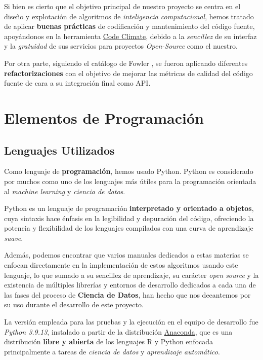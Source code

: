 Si bien es cierto que el objetivo principal de nuestro proyecto se centra en el diseño y explotación de algoritmos de \textit{inteligencia computacional}, hemos tratado de aplicar \textbf{buenas prácticas} de codificación y mantenimiento del código fuente, apoyándonos en la herramienta \href{https://codeclimate.com/github/jesgararm/GestorQuirofanos}{Code Climate}, debido a la \textit{sencillez} de su interfaz y la \textit{gratuidad} de sus servicios para proyectos \textit{Open-Source} como el nuestro.

Por otra parte, siguiendo el catálogo de Fowler \cite{Fowler1999Refactoring:Code}, se fueron aplicando diferentes \textbf{refactorizaciones} con el objetivo de mejorar las métricas de calidad del código fuente de cara a su integración final como API.


\section{Elementos de Programación}

\subsection{Lenguajes Utilizados}

Como lenguaje de \textbf{programación}, hemos usado Python\cite{VanRossum2009PythonManual}. Python es considerado por muchos como uno de los lenguajes más útiles para la programación orientada al \textit{machine learning} y \textit{ciencia de datos}. 

Python es un lenguaje de programación \textbf{interpretado y orientado a objetos}, cuya sintaxis hace énfasis en la legibilidad y depuración del código, ofreciendo la potencia y flexibilidad de los lenguajes compilados con una curva de aprendizaje \textit{suave}. \cite{2021Scikit-LearnPython} 

Además, podemos encontrar que varios manuales dedicados a estas materias \cite{VanderPlas2016PythonData} se enfocan directamente en la implementación de estos algoritmos usando este lenguaje, lo que sumado a su sencillez de aprendizaje, su carácter \textit{open source} y la existencia de múltiples librerías y entornos de desarrollo dedicados a cada una de las fases del proceso de \textbf{Ciencia de Datos}, han hecho que nos decantemos por su uso durante el desarrollo de este proyecto.

La versión empleada para las pruebas y la ejecución en el equipo de desarrollo fue \textit{Python 3.9.13}, instalado a partir de la distribución \href{https://www.anaconda.com/}{Anaconda}, que es una distribución \textbf{libre y abierta} de los lenguajes R y Python enfocada principalmente a tareas de \textit{ciencia de datos} y \textit{aprendizaje automático}.

